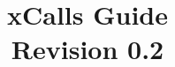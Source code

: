 \documentclass{article}
\begin{document}
\newcommand{\mypar}[1]{\vspace{0.1cm} \noindent \textbf{#1}}
\newcommand{\myitem}{\vspace{-0.1cm} \item}
\newcommand{\todo}[1]{\textbf{TODO [#1]???}} 
\newcommand{\fixme}[1]{\textbf{FIXME [#1]???}} 
\newcommand{\remark}[1]{\textbf{REMARK [#1]???}} 
\newcommand{\codesm}[1]{\texttt{\small #1}}
\newcommand{\eg}{\textit{e.g.}}
\newcommand{\ie}{\textit{i.e.}}
\newcommand{\etal}{\textit{et al.}}
\newcommand{\xcalls}{\textit{xCalls}}
\newcommand{\tmatomic}{\texttt{\_\_tm\_atomic}}
\newcommand{\tmwaiver}{\texttt{\_\_tm\_waiver}}

\date{}

\title{\textsf{\Large xCalls Guide}\\ \textsf{\small Revision 0.2}}

\maketitle

\thispagestyle{empty}







\end{document}
